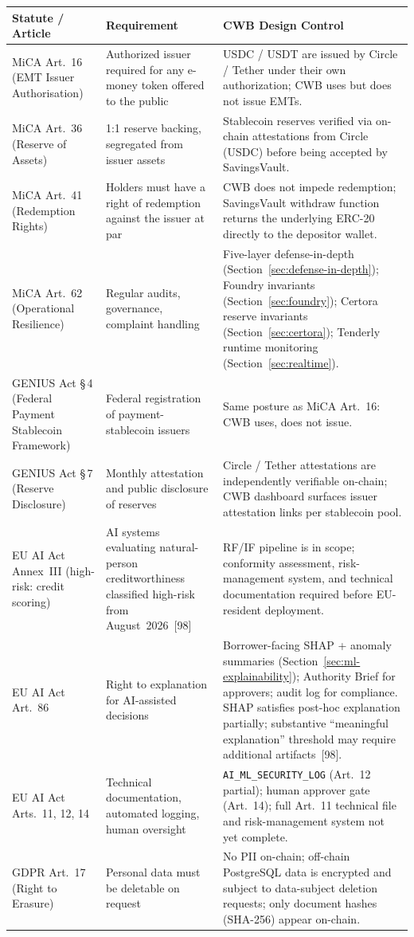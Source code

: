 \documentclass[12pt, a4paper]{report}
\newcommand{\tableheadcolor}{\rowcolor{TableHeadBg}}
\begin{document}
\begin{table}[H]
\centering
\begin{tabular}{p{3.2cm}p{4.6cm}p{5.8cm}}
\toprule
\tableheadcolor
\textbf{Statute / Article} & \textbf{Requirement} & \textbf{CWB Design Control} \\
\midrule
MiCA Art.~16 (EMT Issuer Authorisation) & Authorized issuer required for any e-money token offered to the public & USDC / USDT are issued by Circle / Tether under their own authorization; CWB uses but does not issue EMTs. \\
MiCA Art.~36 (Reserve of Assets) & 1{:}1 reserve backing, segregated from issuer assets & Stablecoin reserves verified via on-chain attestations from Circle (USDC) before being accepted by SavingsVault. \\
MiCA Art.~41 (Redemption Rights) & Holders must have a right of redemption against the issuer at par & CWB does not impede redemption; SavingsVault withdraw function returns the underlying ERC-20 directly to the depositor wallet. \\
MiCA Art.~62 (Operational Resilience) & Regular audits, governance, complaint handling & Five-layer defense-in-depth (Section~\ref{sec:defense-in-depth}); Foundry invariants (Section~\ref{sec:foundry}); Certora reserve invariants (Section~\ref{sec:certora}); Tenderly runtime monitoring (Section~\ref{sec:realtime}). \\
GENIUS Act \S\,4 (Federal Payment Stablecoin Framework) & Federal registration of payment-stablecoin issuers & Same posture as MiCA Art.~16: CWB uses, does not issue. \\
GENIUS Act \S\,7 (Reserve Disclosure) & Monthly attestation and public disclosure of reserves & Circle / Tether attestations are independently verifiable on-chain; CWB dashboard surfaces issuer attestation links per stablecoin pool. \\
EU AI Act Annex~III (high-risk: credit scoring) & AI systems evaluating natural-person creditworthiness classified high-risk from August~2026~[98] & RF/IF pipeline is in scope; conformity assessment, risk-management system, and technical documentation required before EU-resident deployment. \\
EU AI Act Art.~86 & Right to explanation for AI-assisted decisions & Borrower-facing SHAP + anomaly summaries (Section~\ref{sec:ml-explainability}); Authority Brief for approvers; audit log for compliance. SHAP satisfies post-hoc explanation partially; substantive ``meaningful explanation'' threshold may require additional artifacts~[98]. \\
EU AI Act Arts.~11, 12, 14 & Technical documentation, automated logging, human oversight & \texttt{AI\_ML\_SECURITY\_LOG} (Art.~12 partial); human approver gate (Art.~14); full Art.~11 technical file and risk-management system not yet complete. \\
GDPR Art.~17 (Right to Erasure) & Personal data must be deletable on request & No PII on-chain; off-chain PostgreSQL data is encrypted and subject to data-subject deletion requests; only document hashes (SHA-256) appear on-chain. \\
\bottomrule
\end{tabular}
\end{table}
\end{document}
